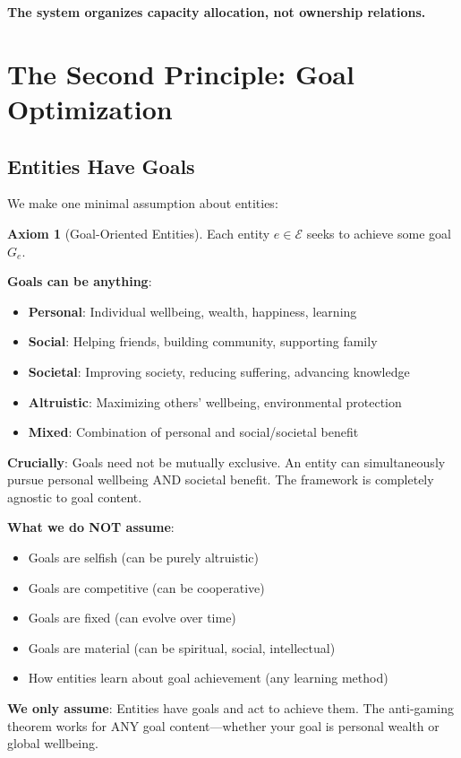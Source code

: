 \documentclass[11pt,a4paper]{article}
\theoremstyle{definition}
\newtheorem{axiom}[theorem]{Axiom}
\theoremstyle{remark}
\newcommand{\E}{\mathcal{E}}
\begin{document}
\textbf{The system organizes capacity allocation, not ownership relations.}

\section{The Second Principle: Goal Optimization}

\subsection{Entities Have Goals}

We make one minimal assumption about entities:

\begin{axiom}[Goal-Oriented Entities]
Each entity $e \in \E$ seeks to achieve some goal $G_e$.
\end{axiom}

\textbf{Goals can be anything}:
\begin{itemize}
\item \textbf{Personal}: Individual wellbeing, wealth, happiness, learning
\item \textbf{Social}: Helping friends, building community, supporting family
\item \textbf{Societal}: Improving society, reducing suffering, advancing knowledge
\item \textbf{Altruistic}: Maximizing others' wellbeing, environmental protection
\item \textbf{Mixed}: Combination of personal and social/societal benefit
\end{itemize}

\textbf{Crucially}: Goals need not be mutually exclusive. An entity can simultaneously pursue personal wellbeing AND societal benefit. The framework is completely agnostic to goal content.

\textbf{What we do NOT assume}:
\begin{itemize}
\item Goals are selfish (can be purely altruistic)
\item Goals are competitive (can be cooperative)
\item Goals are fixed (can evolve over time)
\item Goals are material (can be spiritual, social, intellectual)
\item How entities learn about goal achievement (any learning method)
\end{itemize}

\textbf{We only assume}: Entities have goals and act to achieve them. The anti-gaming theorem works for ANY goal content—whether your goal is personal wealth or global wellbeing.
\end{document}
